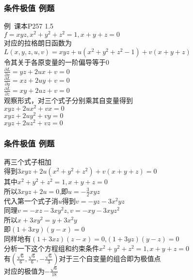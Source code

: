 

\begin{frame}
    \frametitle{条件极值 例题}
	例\ 课本P257 1.5\\
	$f=xyz,x^2+y^2+z^2=1,x+y+z=0$\\
	对应的拉格朗日函数为$L(x,y,z,u,v)=xyz+u(x^2+y^2+z^2-1)+v(x+y+z)$\\\pause
	令其关于各原变量的一阶偏导等于0\\
	$\frac{\partial L}{\partial x}=yz+2ux+v=0$\\
	$\frac{\partial L}{\partial y}=xz+2uy+v=0$\\
	$\frac{\partial L}{\partial z}=xy+2uz+v=0$\\\pause
	观察形式，对三个式子分别乘其自变量得到\\
	$xyz+2ux^2+vx=0$\\
	$xyz+2uy^2+vy=0$\\
	$xyz+2uz^2+vz=0$\\


\end{frame}

\begin{frame}
	\frametitle{条件极值 例题}
	再三个式子相加\\
	得到$3xyz+2u(x^2+y^2+z^2)+v(x+y+z)=0$\\
	其中$x^2+y^2+z^2=1,x+y+z=0$\\\pause
	所以$3xyz+2u=0$,即$u=-\frac{3}{2}xyz$\\
	代入第一个式子消$u$得到$v=-yz-3x^2yz$\\
	同理$v=-xz-3xy^2z,v=-xy-3xyz^2$\\\pause
	所以$x+3xy^2=y+3x^2y$\\
	即$(1+3xy)(y-x)=0$\\\pause
	同样地有$(1+3xz)(z-x)=0$,$(1+3yz)(y-z)=0$\\\pause
	分析一下这个方程组和约束条件$x^2+y^2+z^2=1,x+y+z=0$\\
	有$(\frac{\sqrt{6}}{6},\frac{\sqrt{6}}{6},-\frac{\sqrt{6}}{3})$对于三个自变量的组合即为极值点\\\pause
	对应的极值为$-\frac{\sqrt{6}}{18}$\\
	
\end{frame}

